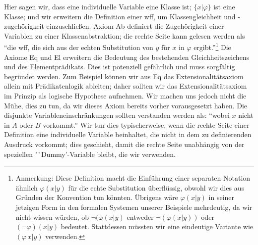 Hier sagen wir, dass eine individuelle Variable eine Klasse ist; $\{x|\varphi\}$ ist eine Klasse; und wir erweitern die Definition einer wff, um Klassengleichheit und -zugehörigkeit einzuschließen.  Axiom Ab definiert die Zugehörigkeit einer Variablen zu einer Klassenabstraktion; die rechte Seite kann gelesen werden als "`die wff, die sich aus der echten Substitution von $y$ für $x$ in $\varphi$ ergibt."'\footnote{Anmerkung: Diese Definition macht die Einführung einer separaten Notation ähnlich $\varphi(x|y)$ für die echte Substitution überflüssig, obwohl wir dies aus Gründen der Konvention tun könnten.  Übrigens wäre $\varphi(x|y)$ in seiner jetzigen Form in den formalen Systemen unserer Beispiele mehrdeutig, da wir nicht wissen würden, ob $\lnot(\varphi(x|y)$ entweder $\lnot(\varphi(x|y))$ oder $(\lnot\varphi)(x|y)$ bedeutet. Stattdessen müssten wir eine eindeutige Variante wie $(\varphi\, x|y)$ verwenden.}  Die Axiome Eq und El erweitern die Bedeutung des bestehenden Gleichheitszeichens und des Elementprädikats.  Dies ist potenziell gefährlich und muss sorgfältig begründet werden.  Zum Beispiel können wir aus Eq das Extensionalitätsaxiom allein mit Prädikatenlogik ableiten; daher sollten wir das Extensionalitätsaxiom im Prinzip als logische Hypothese aufnehmen.  Wir machen uns jedoch nicht die Mühe, dies zu tun, da wir dieses Axiom bereits vorher vorausgesetzt haben. Die disjunkte Variableneinschränkungen sollten verstanden werden als: "`wobei $x$ nicht in $A$ oder $B$ vorkommt."'  Wir tun dies typischerweise, wenn die rechte Seite einer Definition eine individuelle Variable beinhaltet, die nicht in dem zu definierenden Ausdruck vorkommt; dies geschieht, damit die rechte Seite unabhängig von der speziellen "`Dummy'-Variable bleibt, die wir verwenden.

